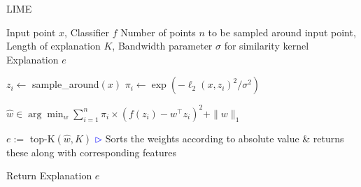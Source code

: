     
    


    
    

\begin{algorithm}[tbh]
\begin{algorithmic}[1]
 \caption{\textsc{LIME} \cite{ribeiro2016should}}
   \label{alg:limeinclear}
    
     Input point $x$, Classifier $f$
     Number of points $n$ to be sampled around input point, Length of explanation $K$, Bandwidth parameter $\sigma$ for similarity kernel
     Explanation $e$
    \STATE
    
        \STATE $z_i \leftarrow$ \rm{sample\_around}$\left(x\right)$
        \STATE $\pi_i \leftarrow \exp \left(-\ell_2(x, z_i)^2 / \sigma^2\right)$ %
    \ENDFOR

    \STATE $\hat{w} \in \arg \min _{w} \sum_{i=1}^n \pi_i \times \left(f\left(z_i\right)-w^{\top} z_i\right)^2+\|w\|_1$

    \STATE $e :=$ top-K$(\hat{w}, K)$ \hfill \textcolor{blue}{$\rhd$} Sorts the weights according to absolute value \& returns these along with corresponding features
    
    \STATE Return Explanation $e$
\end{algorithmic}
\end{algorithm}

